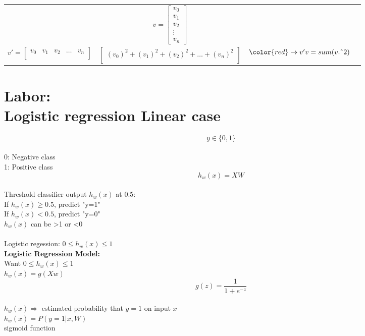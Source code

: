 \documentclass[12pt]{article}
\newcommand\tab[1][1cm]{\hspace*{#1}}
\begin{document}
\begin{tabular}{l*{2}{c}r}
\ 
&
$
v=\left[
\begin{matrix}
	v_{0}\\
	v_{1}\\
	v_{2}\\
	\vdots\\
	v_{n}
\end{matrix} \right]
$
\\
$
v'=\left[
\begin{matrix}
	v_{0} & v_{1} & v_{2}& \hdots & v_{n}\\
\end{matrix} \right]
$
&
$
\left[
\begin{matrix}
	(v_0)^2+(v_1)^2+(v_2)^2+\hdots+(v_n)^2\\	
\end{matrix} \right]
$
&
$
{\color{red}
\rightarrow v'v=sum(v.\char`\^ 2)
}
$
\end{tabular}
\newpage

\section{Labor:\\ \large Logistic regression Linear case}

\begin{equation}
y\in\{0,1\}
\end{equation}\\
0: Negative class\\
1: Positive class\\

\begin{equation}
h_w(x)=XW
\end{equation}\\

Threshold classifier output $h_w(x)$ at 0.5:\\
\tab If $h_w(x)\geq 0.5$, predict "y=1"\\
\tab If $h_w(x)< 0.5$, predict "y=0"\\

$h_w(x)$ can be >1 or <0\\
\hspace{10mm}\\
Logistic regession: $0\leq h_w(x) \leq 1$  \\
\textbf{Logistic Regression Model:}\\
\tab Want $0\leq h_w(x)\leq 1$\\
\tab $h_w(x)=g(Xw)$\\
\begin{equation}
g(z)=\frac{1}{1+e^{-z}}
\end{equation}\\
$h_w(x) \Rightarrow$ estimated probability that $y=1$ on input $x$\\
$h_w(x)=P(y=1|x, W)$\\
sigmoid function
\end{document}
